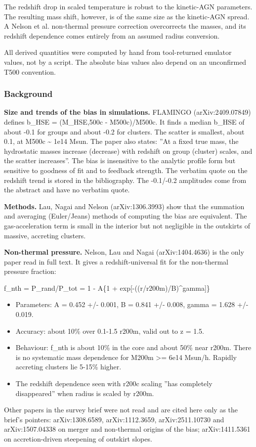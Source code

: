 \documentclass[11pt,a4paper]{article}
\begin{document}
The redshift drop in scaled temperature is robust to the kinetic-AGN parameters. The resulting mass shift, however, is of the same size as the kinetic-AGN spread. A Nelson et al. non-thermal pressure correction overcorrects the masses, and its redshift dependence comes entirely from an assumed radius conversion.

All derived quantities were computed by hand from tool-returned emulator values, not by a script. The absolute bias values also depend on an unconfirmed T500 convention.

\subsubsection*{Background}
\textbf{Size and trends of the bias in simulations.} FLAMINGO (arXiv:2409.07849) defines b\_HSE = (M\_HSE,500c - M500c)/M500c. It finds a median b\_HSE of about -0.1 for groups and about -0.2 for clusters. The scatter is smallest, about 0.1, at M500c \textasciitilde{} 1e14 Msun. The paper also states: ''At a fixed true mass, the hydrostatic masses increase (decrease) with redshift on group (cluster) scales, and the scatter increases''. The bias is insensitive to the analytic profile form but sensitive to goodness of fit and to feedback strength. The verbatim quote on the redshift trend is stored in the bibliography. The -0.1/-0.2 amplitudes come from the abstract and have no verbatim quote.

\textbf{Methods.} Lau, Nagai and Nelson (arXiv:1306.3993) show that the summation and averaging (Euler/Jeans) methods of computing the bias are equivalent. The gas-acceleration term is small in the interior but not negligible in the outskirts of massive, accreting clusters.

\textbf{Non-thermal pressure.} Nelson, Lau and Nagai (arXiv:1404.4636) is the only paper read in full text. It gives a redshift-universal fit for the non-thermal pressure fraction:

f\_nth = P\_rand/P\_tot = 1 - A\{1 + exp[-((r/r200m)/B)\textasciicircum{}gamma]\}

\begin{itemize}
  \item Parameters: A = 0.452 +/- 0.001, B = 0.841 +/- 0.008, gamma = 1.628 +/- 0.019.
  \item Accuracy: about 10\% over 0.1-1.5 r200m, valid out to z = 1.5.
  \item Behaviour: f\_nth is about 10\% in the core and about 50\% near r200m. There is no systematic mass dependence for M200m \textgreater{}= 6e14 Msun/h. Rapidly accreting clusters lie 5-15\% higher.
  \item The redshift dependence seen with r200c scaling ''has completely disappeared'' when radius is scaled by r200m.
\end{itemize}
Other papers in the survey brief were not read and are cited here only as the brief's pointers: arXiv:1308.6589, arXiv:1112.3659, arXiv:2511.10730 and arXiv:1507.04338 on merger and non-thermal origins of the bias; arXiv:1411.5361 on accretion-driven steepening of outskirt slopes.
\end{document}
